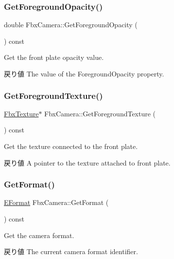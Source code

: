 \subsubsection{\texorpdfstring{Get\+Foreground\+Opacity()}{GetForegroundOpacity()}}
{\footnotesize\ttfamily double Fbx\+Camera\+::\+Get\+Foreground\+Opacity (\begin{DoxyParamCaption}{ }\end{DoxyParamCaption}) const}

Get the front plate opacity value. \begin{DoxyReturn}{戻り値}
The value of the Foreground\+Opacity property. 
\end{DoxyReturn}
\mbox{\label{class_fbx_camera_a93ed0742bf378a047d77fa6daf8233ae}} 
\subsubsection{\texorpdfstring{Get\+Foreground\+Texture()}{GetForegroundTexture()}}
{\footnotesize\ttfamily \hyperlink{class_fbx_texture}{Fbx\+Texture}$\ast$ Fbx\+Camera\+::\+Get\+Foreground\+Texture (\begin{DoxyParamCaption}{ }\end{DoxyParamCaption}) const}

Get the texture connected to the front plate. \begin{DoxyReturn}{戻り値}
A pointer to the texture attached to front plate. 
\end{DoxyReturn}
\mbox{\label{class_fbx_camera_a068be46bd59bcaa398565fcff992d18f}} 
\subsubsection{\texorpdfstring{Get\+Format()}{GetFormat()}}
{\footnotesize\ttfamily \hyperlink{class_fbx_camera_a88d68c983d21e4d6c0f281a8a30f0a06}{E\+Format} Fbx\+Camera\+::\+Get\+Format (\begin{DoxyParamCaption}{ }\end{DoxyParamCaption}) const}

Get the camera format. \begin{DoxyReturn}{戻り値}
The current camera format identifier. 
\end{DoxyReturn}
\mbox{\label{class_fbx_camera_a3097c7c0e8a3ce8e809c248d9d8be18b}} 
